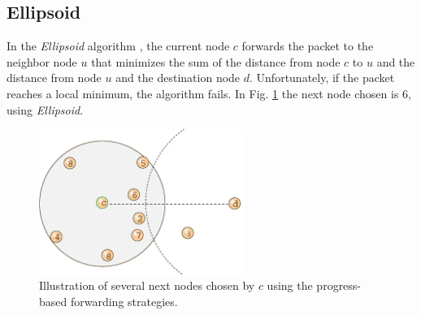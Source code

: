 \documentclass[journal,comsoc]{IEEEtran}
\begin{document}
\subsection{Ellipsoid}
In the \emph{Ellipsoid} algorithm \cite{yama:compass}, the current node \(c\) forwards the packet to the neighbor node \(u\) that minimizes the sum of the distance from node \(c\) to \(u\) and the distance from node \(u\) and the destination node \(d\). Unfortunately, if the packet reaches a local minimum, the algorithm fails. In Fig. \ref{fig:progress} the next node chosen is \(6\), using \emph{Ellipsoid}.

\begin{figure}[!t]
\centering
    \includegraphics[width=2.6in]{progress}
  \caption{Illustration of several next nodes chosen by \(c\) using the progress-based forwarding strategies.}
  \label{fig:progress}
\end{figure}
\end{document}

